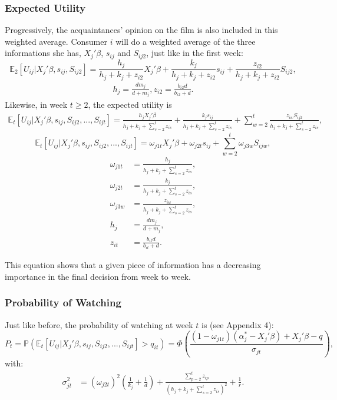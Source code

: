 	\subsubsection{Expected Utility}
	Progressively, the acquaintances' opinion on the film is also included in this weighted average.
	Consumer $i$ will do a weighted average of the three informations she has, $X_{j}'\beta$, $s_{i j}$ and $S_{i j 2}$, just like in the first week:
	\begin{equation}
	\mathbb{E}_2[U_{i j}|X_{j}'\beta, s_{i j}, S_{i j 2}]=\frac{h_{j}}{h_{j}+k_{j}+z_{i 2}} X_{j}'\beta+\frac{k_{j}}{h_{j}+k_{j}+z_{i 2}}s_{i j}+\frac{z_{i 2}}{h_{j}+k_{j}+z_{i 2}}S_{i j 2}, 
	\end{equation}
	\begin{align*}
	h_{j}=\frac{d m_{j}}{d+m_{j}}, z_{i 2}=\frac{b_{i 2}d}{b_{i 2}+d}.
	\end{align*}
	Likewise, in week $t\geq2$, the expected utility is
	\begin{align*}
	\mathbb{E}_t[U_{i j}|X_{j}'\beta, s_{i j}, S_{i j 2}, ..., S_{i j t}]=\frac{h_{j}X_{j}'\beta}{h_{j}+k_{j}+\sum_{s=2}^{t}z_{i s}} +\frac{k_{j}s_{i j}}{h_{j}+k_{j}+\sum_{s=2}^{t}z_{i s}}+\sum_{w=2}^{t}\frac{z_{i w}S_{i j 2}}{h_{j}+k_{j}+\sum_{s=2}^{t}z_{i s}}, 
	\end{align*}
	\begin{equation}
	\mathbb{E}_t[U_{i j}|X_{j}'\beta, s_{i j}, S_{i j 2}, ..., S_{i j t}]=\omega_{j 1 t}X_{j}'\beta +\omega_{j 2 t}s_{i j}+\sum_{w=2}^{t}\omega_{j 3 w}S_{i j w}, 
	\end{equation}
	\begin{align*}
		\omega_{j 1 t}&=\frac{h_{j}}{h_{j}+k_{j}+\sum_{s=2}^{t}z_{i s}}, \\
		\omega_{j 2 t}&=\frac{k_{j}}{h_{j}+k_{j}+\sum_{s=2}^{t}z_{i s}}, \\
		\omega_{j 3 w}&=\frac{z_{i w}}{h_{j}+k_{j}+\sum_{s=2}^{t}z_{i s}},\\
		h_{j}&=\frac{d m_{j}}{d+m_{j}}, \\
		z_{i t}&=\frac{b_{i t}d}{b_{i t}+d}.
	\end{align*}
	
	This equation shows that a given piece of information has a decreasing importance in the final decision from week to week.
	
	\subsubsection{Probability of Watching}
	Just like before, the probability of watching at week $t$ is (see Appendix 4):
	\begin{equation}
	P_{t}=\mathbb{P}(\mathbb{E}_t[U_{i j}|X_{j}'\beta, s_{i j}, S_{i j 2}, ..., S_{i j t}]>q_{i t}) =\Phi\left(\frac{(1-\omega_{j 1 t})(\alpha_{j}^{*}-X_{j}'\beta)+X_{j}'\beta-q}{\sigma_{j t}}\right),
	\end{equation}
	with:
	\begin{align*}
	\sigma_{j t}^{2}
	&=(\omega_{j 2 t })^{2}\left(\frac{1}{k_{j}}+\frac{1}{d}\right)+\frac{\sum_{p=2}^{t}z_{i p}}{(h_{j}+k_{j}+\sum_{s=2}^{t}z_{i s})^{2}}+\frac{1}{r}.
	\end{align*}
	
